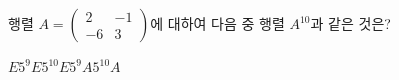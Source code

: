 \hspace*{2mm}\begin{minipage}[t]{\dimexpr\linewidth-2mm\relax}\vspace{0pt}
행렬 $A=\begin{pmatrix} 2 & -1 \\ -6 & 3 \end{pmatrix}$에 대하여 다음 중 행렬 $A^{10}$과 같은 것은? 
\begin{choices32}{$E$}{$5^9E$}{$5^{10}E$}{$5^9A$}{$5^{10}A$}\end{choices32}\end{minipage}
